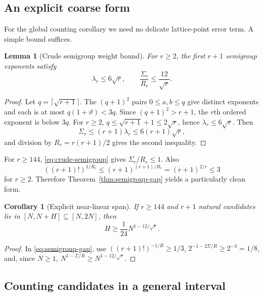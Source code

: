 \documentclass[11pt,oneside]{article}
\newtheorem{lemma}[theorem]{Lemma}
\newtheorem{corollary}[theorem]{Corollary}
\theoremstyle{definition}
\theoremstyle{remark}
\newcommand{\thetaq}{\vartheta}
\begin{document}
\subsection{An explicit coarse form}

For the global counting corollary we need no delicate lattice-point error term.  A simple
bound suffices.

\begin{lemma}[Crude semigroup weight bound]
\label{lem:crude-semigroup}
For $r\ge2$, the first $r+1$ semigroup exponents satisfy
\begin{equation}
 \lambda_r\le6\sqrt r,
 \qquad
 \frac{\Sigma_r}{R_r}\le\frac{12}{\sqrt r}.
 \label{eq:crude-semigroup}
\end{equation}
\end{lemma}

\begin{proof}
Let $q=\lceil\sqrt{r+1}\rceil$.  The $(q+1)^2$ pairs
$0\le a,b\le q$ give distinct exponents and each is at most
$q(1+\thetaq)<3q$.  Since $(q+1)^2>r+1$, the $r$th ordered exponent is below $3q$.
For $r\ge2$,
$q\le\sqrt{r+1}+1\le2\sqrt r$, hence $\lambda_r\le6\sqrt r$.
Then
\[
 \Sigma_r\le(r+1)\lambda_r\le6(r+1)\sqrt r,
\]
and division by $R_r=r(r+1)/2$ gives the second inequality.
\end{proof}

For $r\ge144$, \eqref{eq:crude-semigroup} gives $\Sigma_r/R_r\le1$.  Also
\[
 ((r+1)!)^{1/R_r}
 \le(r+1)^{(r+1)/R_r}
 =(r+1)^{2/r}\le3
\]
for $r\ge2$.  Therefore Theorem~\ref{thm:semigroup-gap} yields a particularly clean form.

\begin{corollary}[Explicit near-linear span]
\label{cor:explicit-semigroup-span}
If $r\ge144$ and $r+1$ natural candidates lie in
$[N,N+H]\subseteq[N,2N]$, then
\begin{equation}
 H\ge\frac1{24}N^{1-12/\sqrt r}.
 \label{eq:explicit-semigroup-span}
\end{equation}
\end{corollary}

\begin{proof}
In \eqref{eq:semigroup-gap}, use
$((r+1)!)^{-1/R}\ge1/3$,
$2^{-1-2\Sigma/R}\ge2^{-3}=1/8$, and, since $N\ge1$,
$N^{1-\Sigma/R}\ge N^{1-12/\sqrt r}$.
\end{proof}

\subsection{Counting candidates in a general interval}
\end{document}
